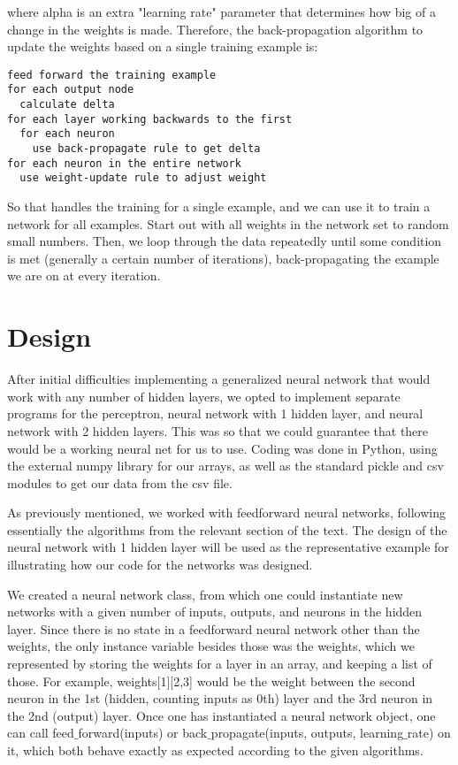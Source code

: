 \documentclass[11pt]{article} %
\begin{document}
where alpha is an extra "learning rate" parameter that determines how big of a change in the weights is made. Therefore, the back-propagation algorithm to update the weights based on a single training example is:

\begin{verbatim}
feed forward the training example
for each output node
  calculate delta
for each layer working backwards to the first
  for each neuron
    use back-propagate rule to get delta
for each neuron in the entire network
  use weight-update rule to adjust weight
\end{verbatim}

So that handles the training for a single example, and we can use it to train a network for all examples. Start out with all weights in the network set to random small numbers. Then, we loop through the data repeatedly until some condition is met (generally a certain number of iterations), back-propagating the example we are on at every iteration.

\section{Design}

After initial difficulties implementing a generalized neural network that would work with any number of hidden layers, we opted to implement separate programs for the perceptron, neural network with 1 hidden layer, and neural network with 2 hidden layers. This was so that we could guarantee that there would be a working neural net for us to use. Coding was done in Python, using the external numpy library for our arrays, as well as the standard pickle and csv modules to get our data from the csv file.

As previously mentioned, we worked with feedforward neural networks, following essentially the algorithms from the relevant section of the text. The design of the neural network with 1 hidden layer will be used as the representative example for illustrating how our code for the networks was designed.

We created a neural network class, from which one could instantiate new networks with a given number of inputs, outputs, and neurons in the hidden layer. Since there is no state in a feedforward neural network other than the weights, the only instance variable besides those was the weights, which we represented by storing the weights for a layer in an array, and keeping a list of those. For example, weights[1][2,3] would be the weight between the second neuron in the 1st (hidden, counting inputs as 0th) layer and the 3rd neuron in the 2nd (output) layer. Once one has instantiated a neural network object, one can call feed$\_$forward(inputs) or back$\_$propagate(inputs, outputs, learning$\_$rate) on it, which both behave exactly as expected according to the given algorithms.
\end{document}
